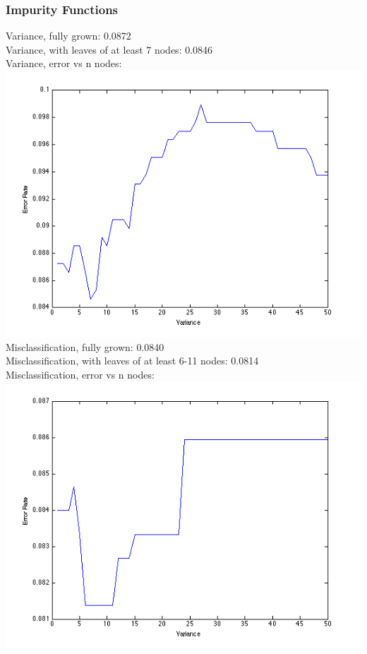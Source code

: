 \documentclass[11pt,a4paper]{article}
\begin{document}
\subsubsection{Impurity Functions}
Variance, fully grown: 0.0872 \\
Variance, with leaves of at least 7 nodes: 0.0846 \\
Variance, error vs n nodes:\\
\includegraphics[width=\textwidth]{decision_tree_variance_error_vs_n_nodes.png}
Misclassification, fully grown: 0.0840\\
Misclassification, with leaves of at least 6-11 nodes: 0.0814 \\
Misclassification, error vs n nodes:\\
\includegraphics[width=\textwidth]{decision_tree_misclassification_error_vs_n_nodes.png}
\end{document}
